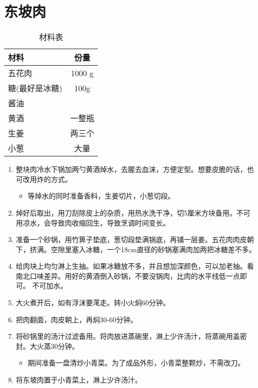 \section{东坡肉}
\begin{table}[h]
    \centering
    \begin{tabular}{|l||c|}\hline
     \textbf{材料}    &  \textbf{份量}\\ \hline\hline
    五花肉     &  1000 g \\ \hline
    糖(最好是冰糖)     &  100g \\ \hline
    酱油     &   \\ \hline
    黄酒     &  一整瓶 \\ \hline
    生姜     &  两三个 \\ \hline
    小葱     &   大量\\ \hline
    \end{tabular}
    \caption{材料表}
\end{table}

\begin{enumerate}
    \item 整块肉冷水下锅加两勺黄酒焯水，去腥去血沫，方便定型。想要皮脆的话，也可改用炸的方式。
    \begin{itemize}
        \item 等焯水的同时准备香料，生姜切片，小葱切段。
    \end{itemize}
    \item 焯好后取出，用刀刮除皮上的杂质，用热水洗干净，切5厘米方块备用。不可用凉水，会导致肉收缩回生，导致烹调时间变长。
    \item 准备一个砂锅，用竹箅子垫底，葱切段垫满锅底，再铺一层姜。五花肉肉皮朝下，挤满。空隙里塞入冰糖，一个18cm直径的砂锅塞满肉加两把冰糖差不多。
    \item 给肉块上均匀淋上生抽。如果冰糖放不多，并且想加深颜色，可以加老抽。看南北口味差异。用好的黄酒倒入砂锅，不要没锅肉，比肉的水平线低一点即可。 不可加水。
    \item 大火煮开后，如有浮沫要滗走。转小火焖60分钟。
    \item 把肉翻面，肉皮朝上，再焖30-60分钟。
    \item 将砂锅里的汤汁过滤备用。将肉放进蒸碗里，淋上少许汤汁，将蒸碗用盖密封。大火蒸30分钟。
    \begin{itemize}
        \item 期间准备一盘清炒小青菜。为了成品外形，小青菜整颗炒，不需改刀。
    \end{itemize}
    \item 将东坡肉置于小青菜上，淋上少许汤汁。
\end{enumerate}

